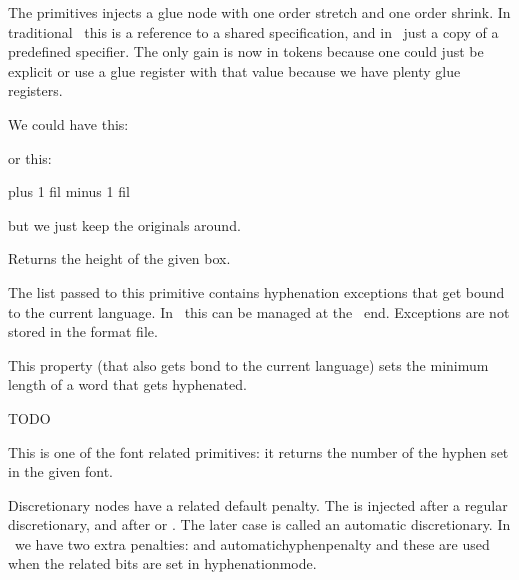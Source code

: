 \typebuffer

The  primitives injects a glue node with one order stretch and one
order shrink. In traditional \TEX\ this is a reference to a shared specification,
and in \LUATEX\ just a copy of a predefined specifier. The only gain is now in
tokens because one could just be explicit or use a glue register with that value
because we have plenty glue registers.

\startlines
\getbuffer
\stoplines

We could have this:

\starttyping
\permanent\protected\untraced{}
\stoptyping

or this:

\starttyping
\gluespecdef\hssglue 0pt plus 1 fil minus 1 fil

\permanent\protected\untraced\def\hss
  {\hskip\hssglue}
\stoptyping

but we just keep the originals around.

\stopoldprimitive

\startoldprimitive[title={\prm {ht}}]

Returns the height of the given box.

\stopoldprimitive

\startoldprimitive[title={\prm {hyphenation}}]

The list passed to this primitive contains hyphenation exceptions that get bound
to the current language. In \LUAMETATEX\ this can be managed at the \LUA\ end.
Exceptions are not stored in the format file.

\stopoldprimitive

\startnewprimitive[title={\prm {hyphenationmin}}]

This property (that also gets bond to the current language) sets the minimum
length of a word that gets hyphenated.

\stopnewprimitive

\startnewprimitive[title={\prm {hyphenationmode}}]
    TODO
\stopnewprimitive

\startoldprimitive[title={\prm {hyphenchar}}]

This is one of the font related primitives: it returns the number of the hyphen
set in the given font.

\stopoldprimitive

\startoldprimitive[title={\prm {hyphenpenalty}}]

Discretionary nodes have a related default penalty. The  is
injected after a regular discretionary, and  after \type
{\-} or \type {-}. The later case is called an automatic discretionary. In
\LUAMETATEX\ we have two extra penalties:  and \prm
{automatichyphenpenalty} and these are used when the related bits are set in \prm
{hyphenationmode}.

